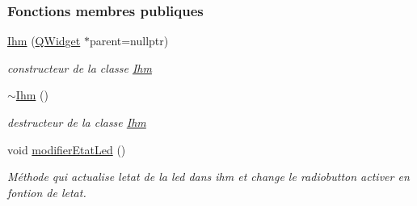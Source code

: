 \subsubsection*{Fonctions membres publiques}
\begin{DoxyCompactItemize}
\item 
\hyperlink{class_ihm_a50a7a15775452923868348bdbe4fa51e}{Ihm} (\hyperlink{class_q_widget}{Q\+Widget} $\ast$parent=nullptr)
\begin{DoxyCompactList}\small\item\em constructeur de la classe \hyperlink{class_ihm}{Ihm} \end{DoxyCompactList}\item 
\hyperlink{class_ihm_add292ea9005bacd1de44dd1ed9ede5b9}{$\sim$\+Ihm} ()
\begin{DoxyCompactList}\small\item\em destructeur de la classe \hyperlink{class_ihm}{Ihm} \end{DoxyCompactList}\item 
void \hyperlink{class_ihm_af0426507c2130aefd01bdb4f825ae168}{modifier\+Etat\+Led} ()
\begin{DoxyCompactList}\small\item\em Méthode qui actualise l\textquotesingle{}etat de la led dans ihm et change le radiobutton activer en fontion de l\textquotesingle{}etat. \end{DoxyCompactList}\end{DoxyCompactItemize}
